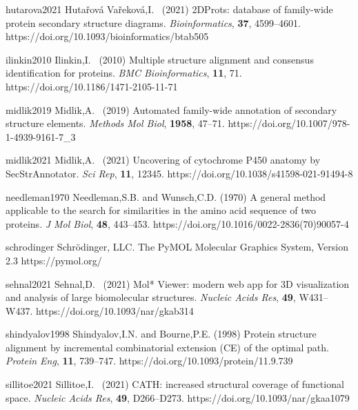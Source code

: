 \documentclass{article}
\begin{document}
\myreference
{hutarova2021}
{Hutařová Vařeková,I. \etal\ (2021) 
2DProts: database of family-wide protein secondary structure diagrams. 
\emph{Bioinformatics}, \textbf{37}, 4599--4601.}
{https://doi.org/10.1093/bioinformatics/btab505}

\myreference
{ilinkin2010}
{Ilinkin,I. \etal\ (2010) 
Multiple structure alignment and consensus identification for proteins. 
\emph{BMC Bioinformatics}, \textbf{11}, 71.}
{https://doi.org/10.1186/1471-2105-11-71}

\myreference
{midlik2019}
{Midlik,A. \etal\ (2019) 
Automated family-wide annotation of secondary structure elements. 
\emph{Methods Mol Biol}, \textbf{1958}, 47--71.}
{https://doi.org/10.1007/978-1-4939-9161-7_3}

\myreference
{midlik2021}
{Midlik,A. \etal\ (2021) 
Uncovering of cytochrome P450 anatomy by SecStrAnnotator. 
\emph{Sci Rep}, \textbf{11}, 12345.}
{https://doi.org/10.1038/s41598-021-91494-8}

\myreference
{needleman1970}
{Needleman,S.B. and Wunsch,C.D. (1970)
A general method applicable to the search for similarities in the amino acid sequence of two proteins.
\emph{J Mol Biol}, \textbf{48}, 443--453.}
{https://doi.org/10.1016/0022-2836(70)90057-4}

\myreference
{schrodinger}
{Schrödinger, LLC. The PyMOL Molecular Graphics System, Version 2.3}
{https://pymol.org/}

\myreference
{sehnal2021}
{Sehnal,D. \etal\ (2021)
Mol* Viewer: modern web app for 3D visualization and analysis of large biomolecular structures. 
\emph{Nucleic Acids Res}, \textbf{49}, W431--W437.}
{https://doi.org/10.1093/nar/gkab314}

\myreference
{shindyalov1998}
{Shindyalov,I.N. and Bourne,P.E. (1998) 
Protein structure alignment by incremental combinatorial extension (CE) of the optimal path. 
\emph{Protein Eng}, \textbf{11}, 739--747.}
{https://doi.org/10.1093/protein/11.9.739}

\myreference
{sillitoe2021}
{Sillitoe,I. \etal\ (2021) 
CATH: increased structural coverage of functional space. 
\emph{Nucleic Acids Res}, \textbf{49}, D266--D273.}
{https://doi.org/10.1093/nar/gkaa1079}
\end{document}
